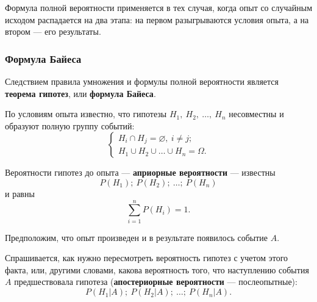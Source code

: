 \documentclass[a4paper]{article}
\newcommand{\none}{\varnothing}
\newcommand{\key}[1]{{\color{Medium}\bfseries #1}}
\begin{document}
                Формула полной вероятности применяется в тех случая, когда опыт со случайным исходом распадается на два этапа: на первом разыгрываются условия опыта, а на втором --- его результаты.

            \subsubsection{Формула Байеса}
                
                Следствием правила умножения и формулы полной вероятности является \key{теорема гипотез}, или \key{формула Байеса}.

                По условиям опыта известно, что гипотезы $H_1 , \: H_2 , \: \ldots , \: H_n$ несовместны и образуют полную группу событий:
                \begin{equation*}
                    \begin{cases}
                        H_i \cap H_j = \none, \: i \neq j ; \\[1.0ex]
                        H_1 \cup H_2 \cup \ldots \cup H_n = \Omega .
                    \end{cases}
                \end{equation*}

                Вероятности гипотез до опыта --- \key{априорные вероятности} --- известны
                \begin{equation*}
                    P(H_1) ; \: P(H_2) ; \: \ldots ; \: P(H_n)
                \end{equation*}
                и равны
                \begin{equation*}
                    \sum\limits_{i = 1}^{n} P(H_i) = 1 .
                \end{equation*}

                Предположим, что опыт произведен и в результате появилось событие $A$.
                
                Спрашивается, как нужно пересмотреть вероятность гипотез с учетом этого факта, или, другими словами, какова вероятность того, что наступлению события $A$ предшествовала гипотеза (\key{апостериорные вероятности} --- послеопытные):
                \begin{equation*}
                    P(H_1 | A) ; \: P(H_2 | A) ; \: \ldots ; \: P(H_n | A) .
                \end{equation*}
\end{document}
